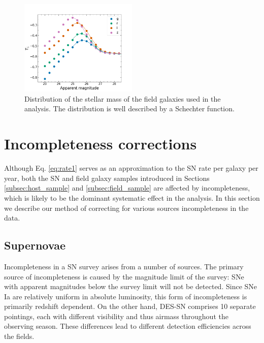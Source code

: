 \documentclass[fleqn,usenatbib]{mnras}
\begin{document}

\begin{figure}
    \centering
    \includegraphics[width=0.5\textwidth]{figs/SN-X3_Tc.png}
    \caption{Distribution of the stellar mass of the field galaxies used in the analysis. The distribution is well described by a Schechter function.
    \label{fig:log_mass_field}}
\end{figure}

\section{Incompleteness corrections}
\label{sec:incompleteness}
Although Eq. \ref{eq:rate1} serves as an approximation to the SN rate per galaxy per year, both the SN and field galaxy samples introduced in Sections \ref{subsec:host_sample} and \ref{subsec:field_sample} are affected by incompleteness, which is likely to be the dominant systematic effect in the analysis. In this section we describe our method of correcting for various sources incompleteness in the data.

\subsection{Supernovae \label{subsec:incompleteness_SNe}}

Incompleteness in a SN survey arises from a number of sources. The primary source of incompleteness is caused by the magnitude limit of the survey: SNe with apparent magnitudes below the survey limit will not be detected. Since SNe Ia are relatively uniform in absolute luminosity, this form of incompleteness is primarily redshift dependent. On the other hand, DES-SN comprises 10 separate pointings, each with different visibility and thus airmass throughout the observing season. These differences lead to different detection efficiencies across the fields.
\end{document}
